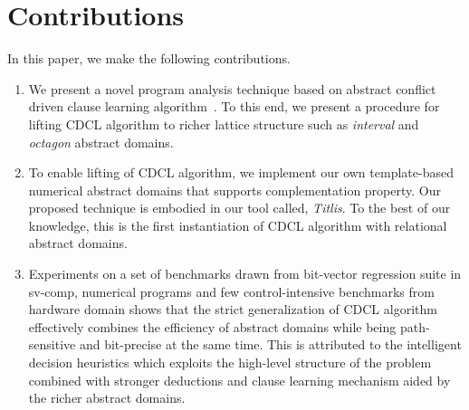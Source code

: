 \section{Contributions}
In this paper, we make the following contributions.
\begin{enumerate}
\item We present a novel program analysis technique based on 
abstract conflict driven clause learning algorithm~\cite{dhk2013-popl}.
To this end, we present a procedure for lifting CDCL algorithm to 
richer lattice structure such as {\em interval} and {\em octagon} 
abstract domains.  

\item To enable lifting of CDCL algorithm, we implement 
our own template-based numerical abstract domains that 
supports complementation property.  Our proposed technique 
is embodied in our tool called, {\em Titlis}.  To the best 
of our knowledge, this is the first instantiation of CDCL 
algorithm with relational abstract domains. 
 
\item  Experiments on a set of benchmarks drawn from bit-vector 
regression suite in sv-comp, numerical programs and few 
control-intensive benchmarks from hardware domain shows that 
the strict generalization of CDCL algorithm effectively combines 
the efficiency of abstract domains while being path-sensitive and 
bit-precise at the same time.  This is attributed to the intelligent 
decision heuristics which exploits the high-level structure of the 
problem combined with stronger deductions and clause learning 
mechanism aided by the richer abstract domains.
\end{enumerate}
